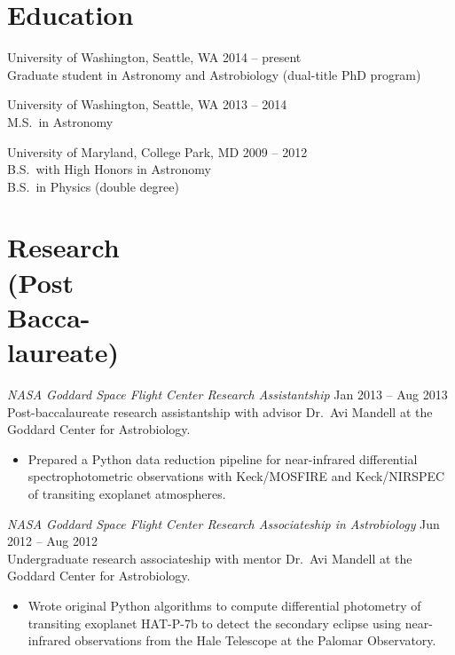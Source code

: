 \documentclass[margin]{res}
\begin{document}
\begin{resume}

\section{Education} 
University of Washington, Seattle, WA \hfill 2014 -- present\\
Graduate student in Astronomy and Astrobiology (dual-title PhD program)

University of Washington, Seattle, WA \hfill 2013 -- 2014\\
M.S.\ in Astronomy 

University of Maryland, College Park, MD  \hfill 2009 -- 2012\\
B.S.\ with High Honors in Astronomy \\
B.S.\ in Physics (double degree)\\
 
\section{Research \\(Post \\Bacca-\\laureate)} 

{\sl NASA Goddard Space Flight Center Research Assistantship} \hfill           Jan 2013 -- Aug 2013\\
Post-baccalaureate research assistantship with advisor Dr.\ Avi Mandell at the Goddard Center for Astrobiology.
\begin{itemize}%
\item Prepared a Python data reduction pipeline for near-infrared differential spectrophotometric observations with Keck/MOSFIRE and Keck/NIRSPEC of transiting exoplanet atmospheres.
\end{itemize}  

{\sl NASA Goddard Space Flight Center Research Associateship in Astrobiology} \hfill            Jun 2012 -- Aug 2012 \\
Undergraduate research associateship with mentor Dr.\ Avi Mandell at the Goddard Center for Astrobiology.
\begin{itemize}%
\item Wrote original Python algorithms to compute differential photometry of transiting exoplanet HAT-P-7b to detect the secondary eclipse using near-infrared observations from the Hale Telescope at the Palomar Observatory. 


\end{itemize}
\end{resume}
\end{document}
